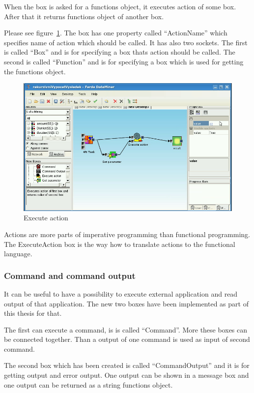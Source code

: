 \documentclass[a4paper,12pt]{book}
\begin{document}
When the box is asked for a functions object, it executes action of some box. After that it returns functions object of another box.

Please see figure~\ref{fig:boxExecuteAction}. The box has one property called ``ActionName'' which specifies name of action which should be called. It has also two sockets. The first is called ``Box'' and is for specifying a box thats action should be called. The second is called ``Function'' and is for specifying a box which is used for getting the functions object.

\begin{figure}
	\includegraphics[width=1\textwidth]{executeAction2.png}
	\caption{Execute action}
	\label{fig:boxExecuteAction}
\end{figure}

Actions are more parts of imperative programming than functional programming. The ExecuteAction box is the way how to translate actions to the functional language. 

\subsubsection{Command and command output}
It can be useful to have a possibility to execute external application and read output of that application. The new two boxes have been implemented as part of this thesis for that.

The first can execute a command, is is called ``Command''. More these boxes can be connected together. Than a output of one command is used as input of second command.

The second box which has been created is called ``CommandOutput'' and it is for getting output and error output. One output can be shown in a message box and one output can be returned as a string functions object.
\end{document}
